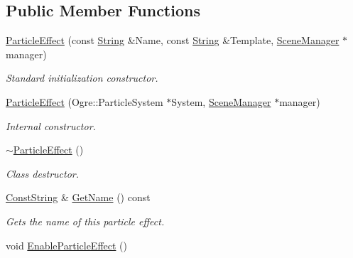 \subsection*{Public Member Functions}
\begin{DoxyCompactItemize}
\item 
\hyperlink{classphys_1_1ParticleEffect_a42d17b7cd81968603c70920c30e6f812}{ParticleEffect} (const \hyperlink{namespacephys_aa03900411993de7fbfec4789bc1d392e}{String} \&Name, const \hyperlink{namespacephys_aa03900411993de7fbfec4789bc1d392e}{String} \&Template, \hyperlink{classphys_1_1SceneManager}{SceneManager} $\ast$manager)
\begin{DoxyCompactList}\small\item\em Standard initialization constructor. \item\end{DoxyCompactList}\item 
\hyperlink{classphys_1_1ParticleEffect_a112c7e4b2ec7c34c3aba3bd422ef8a1c}{ParticleEffect} (Ogre::ParticleSystem $\ast$System, \hyperlink{classphys_1_1SceneManager}{SceneManager} $\ast$manager)
\begin{DoxyCompactList}\small\item\em Internal constructor. \item\end{DoxyCompactList}\item 
\hypertarget{classphys_1_1ParticleEffect_a8c9c3d0cd1d02acdc626266ee485f51f}{
\hyperlink{classphys_1_1ParticleEffect_a8c9c3d0cd1d02acdc626266ee485f51f}{$\sim$ParticleEffect} ()}
\label{d2/d69/classphys_1_1ParticleEffect_a8c9c3d0cd1d02acdc626266ee485f51f}

\begin{DoxyCompactList}\small\item\em Class destructor. \item\end{DoxyCompactList}\item 
\hyperlink{namespacephys_a5ce5049f8b4bf88d6413c47b504ebb31}{ConstString} \& \hyperlink{classphys_1_1ParticleEffect_a770309a3ec74b8bff6169ce5aecc64e7}{GetName} () const 
\begin{DoxyCompactList}\small\item\em Gets the name of this particle effect. \item\end{DoxyCompactList}\item 
\hypertarget{classphys_1_1ParticleEffect_aee95ac9b688885361d3066a5a4b83965}{
void \hyperlink{classphys_1_1ParticleEffect_aee95ac9b688885361d3066a5a4b83965}{EnableParticleEffect} ()}
\label{d2/d69/classphys_1_1ParticleEffect_aee95ac9b688885361d3066a5a4b83965}


\end{DoxyCompactItemize}
